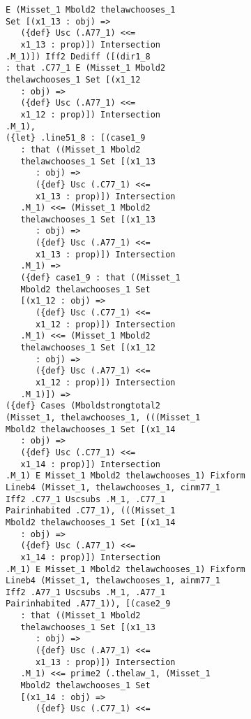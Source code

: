 \documentclass[12pt]{article}
\begin{document}
\begin{verbatim}
             E (Misset_1 Mbold2 thelawchooses_1 
             Set [(x1_13 : obj) => 
                ({def} Usc (.A77_1) <<= 
                x1_13 : prop)]) Intersection 
             .M_1)]) Iff2 Dediff ([(dir1_8 
             : that .C77_1 E (Misset_1 Mbold2 
             thelawchooses_1 Set [(x1_12 
                : obj) => 
                ({def} Usc (.A77_1) <<= 
                x1_12 : prop)]) Intersection 
             .M_1), 
             ({let} .line51_8 : [(case1_9 
                : that ((Misset_1 Mbold2 
                thelawchooses_1 Set [(x1_13 
                   : obj) => 
                   ({def} Usc (.C77_1) <<= 
                   x1_13 : prop)]) Intersection 
                .M_1) <<= (Misset_1 Mbold2 
                thelawchooses_1 Set [(x1_13 
                   : obj) => 
                   ({def} Usc (.A77_1) <<= 
                   x1_13 : prop)]) Intersection 
                .M_1) => 
                ({def} case1_9 : that ((Misset_1 
                Mbold2 thelawchooses_1 Set 
                [(x1_12 : obj) => 
                   ({def} Usc (.C77_1) <<= 
                   x1_12 : prop)]) Intersection 
                .M_1) <<= (Misset_1 Mbold2 
                thelawchooses_1 Set [(x1_12 
                   : obj) => 
                   ({def} Usc (.A77_1) <<= 
                   x1_12 : prop)]) Intersection 
                .M_1)]) => 
             ({def} Cases (Mboldstrongtotal2 
             (Misset_1, thelawchooses_1, (((Misset_1 
             Mbold2 thelawchooses_1 Set [(x1_14 
                : obj) => 
                ({def} Usc (.C77_1) <<= 
                x1_14 : prop)]) Intersection 
             .M_1) E Misset_1 Mbold2 thelawchooses_1) Fixform 
             Lineb4 (Misset_1, thelawchooses_1, cinm77_1 
             Iff2 .C77_1 Uscsubs .M_1, .C77_1 
             Pairinhabited .C77_1), (((Misset_1 
             Mbold2 thelawchooses_1 Set [(x1_14 
                : obj) => 
                ({def} Usc (.A77_1) <<= 
                x1_14 : prop)]) Intersection 
             .M_1) E Misset_1 Mbold2 thelawchooses_1) Fixform 
             Lineb4 (Misset_1, thelawchooses_1, ainm77_1 
             Iff2 .A77_1 Uscsubs .M_1, .A77_1 
             Pairinhabited .A77_1)), [(case2_9 
                : that ((Misset_1 Mbold2 
                thelawchooses_1 Set [(x1_13 
                   : obj) => 
                   ({def} Usc (.A77_1) <<= 
                   x1_13 : prop)]) Intersection 
                .M_1) <<= prime2 (.thelaw_1, (Misset_1 
                Mbold2 thelawchooses_1 Set 
                [(x1_14 : obj) => 
                   ({def} Usc (.C77_1) <<= 

\end{verbatim}
\end{document}
